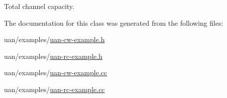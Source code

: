 Total channel capacity. 



The documentation for this class was generated from the following files\+:\begin{DoxyCompactItemize}
\item 
uan/examples/\hyperlink{uan-cw-example_8h}{uan-\/cw-\/example.\+h}\item 
uan/examples/\hyperlink{uan-rc-example_8h}{uan-\/rc-\/example.\+h}\item 
uan/examples/\hyperlink{uan-cw-example_8cc}{uan-\/cw-\/example.\+cc}\item 
uan/examples/\hyperlink{uan-rc-example_8cc}{uan-\/rc-\/example.\+cc}\end{DoxyCompactItemize}
